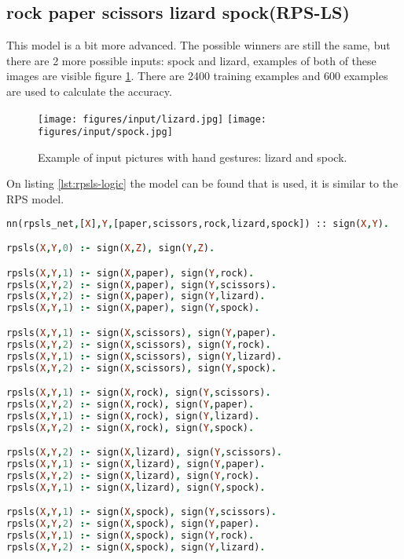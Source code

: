 \subsection{rock paper scissors lizard spock(RPS-LS)}

This model is a bit more advanced. The possible winners are still the same, but there are 2 more possible inputs: spock and lizard, examples of both of these images are visible figure \ref{fig:rpsls_input}. There are 2400 training examples and 600 examples are used to calculate the accuracy. 

\begin{figure}[htp]
    \centering
    \texttt{[image: figures/input/lizard.jpg]}
    \texttt{[image: figures/input/spock.jpg]}
    \caption{Example of input pictures with hand gestures: lizard and spock\cite{RPSLS-database}.} %
    \label{fig:rpsls_input}
\end{figure}

On listing \ref{lst:rpsls-logic} the model can be found that is used, it is similar to the RPS model.

\begin{lstlisting}[label={lst:rpsls-logic},language=Prolog,frame=single,caption={Rock paper scissors lizard spock DeepProbLog model},captionpos=b]
nn(rpsls_net,[X],Y,[paper,scissors,rock,lizard,spock]) :: sign(X,Y).

rpsls(X,Y,0) :- sign(X,Z), sign(Y,Z).

rpsls(X,Y,1) :- sign(X,paper), sign(Y,rock).
rpsls(X,Y,2) :- sign(X,paper), sign(Y,scissors).
rpsls(X,Y,2) :- sign(X,paper), sign(Y,lizard).
rpsls(X,Y,1) :- sign(X,paper), sign(Y,spock).

rpsls(X,Y,1) :- sign(X,scissors), sign(Y,paper).
rpsls(X,Y,2) :- sign(X,scissors), sign(Y,rock).
rpsls(X,Y,1) :- sign(X,scissors), sign(Y,lizard).
rpsls(X,Y,2) :- sign(X,scissors), sign(Y,spock).

rpsls(X,Y,1) :- sign(X,rock), sign(Y,scissors).
rpsls(X,Y,2) :- sign(X,rock), sign(Y,paper).
rpsls(X,Y,1) :- sign(X,rock), sign(Y,lizard).
rpsls(X,Y,2) :- sign(X,rock), sign(Y,spock).

rpsls(X,Y,2) :- sign(X,lizard), sign(Y,scissors).
rpsls(X,Y,1) :- sign(X,lizard), sign(Y,paper).
rpsls(X,Y,2) :- sign(X,lizard), sign(Y,rock).
rpsls(X,Y,1) :- sign(X,lizard), sign(Y,spock).

rpsls(X,Y,1) :- sign(X,spock), sign(Y,scissors).
rpsls(X,Y,2) :- sign(X,spock), sign(Y,paper).
rpsls(X,Y,1) :- sign(X,spock), sign(Y,rock).
rpsls(X,Y,2) :- sign(X,spock), sign(Y,lizard).
    \end{lstlisting}


